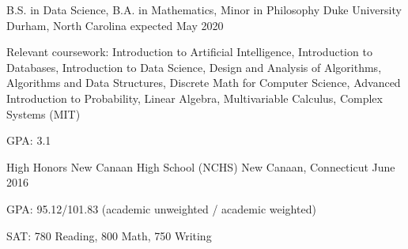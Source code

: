 


\begin{cventries}


\cventry
{B.S. in Data Science, B.A. in Mathematics, Minor in Philosophy} %
{Duke University} %
{Durham, North Carolina} %
{expected May 2020} %
{ %
\begin{cvitems}
\item {Relevant coursework: Introduction to Artificial Intelligence, Introduction to Databases, Introduction to Data Science, Design and Analysis of Algorithms, Algorithms and Data Structures, Discrete Math for Computer Science, Advanced Introduction to Probability, Linear Algebra, Multivariable Calculus, Complex Systems (MIT)
}
\item {GPA: 3.1}
\end{cvitems}
}


\cventry
{High Honors} %
{New Canaan High School (NCHS)} %
{New Canaan, Connecticut} %
{June 2016} %
{ %
\begin{cvitems}
\item {GPA: 95.12/101.83 (academic unweighted / academic weighted)}
\item {SAT: 780 Reading, 800 Math, 750 Writing}
\end{cvitems}
}




\end{cventries}